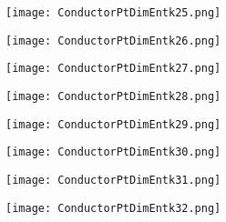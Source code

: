 \documentclass[pdf]{beamer}
\begin{document}
\begin{frame}
\begin{figure}[!h]
\centering
\texttt{[image: ConductorPtDimEntk25.png]}
\end{figure}
\end{frame}

\begin{frame}
\begin{figure}[!h]
\centering
\texttt{[image: ConductorPtDimEntk26.png]}
\end{figure}
\end{frame}

\begin{frame}
\begin{figure}[!h]
\centering
\texttt{[image: ConductorPtDimEntk27.png]}
\end{figure}
\end{frame}

\begin{frame}
\begin{figure}[!h]
\centering
\texttt{[image: ConductorPtDimEntk28.png]}
\end{figure}
\end{frame}

\begin{frame}
\begin{figure}[!h]
\centering
\texttt{[image: ConductorPtDimEntk29.png]}
\end{figure}
\end{frame}

\begin{frame}
\begin{figure}[!h]
\centering
\texttt{[image: ConductorPtDimEntk30.png]}
\end{figure}
\end{frame}

\begin{frame}
\begin{figure}[!h]
\centering
\texttt{[image: ConductorPtDimEntk31.png]}
\end{figure}
\end{frame}

\begin{frame}
\begin{figure}[!h]
\centering
\texttt{[image: ConductorPtDimEntk32.png]}
\end{figure}
\end{frame}
\end{document}
